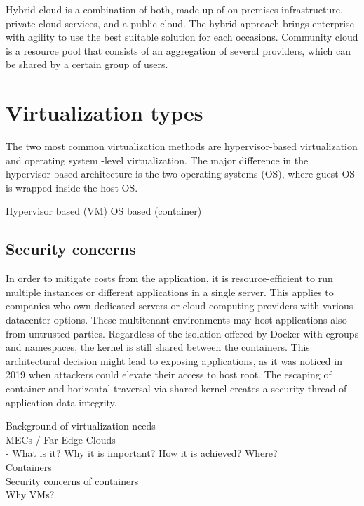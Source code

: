 Hybrid cloud is a combination of both, made up of on-premises infrastructure, private cloud services, and a public cloud. The hybrid approach brings enterprise with agility to use the best suitable solution for each occasions. \cite{NetApp} Community cloud is a resource pool that consists of an aggregation of several providers, which can be shared by a certain group of users. \cite{Taleb2017}


\section{Virtualization types}

The two most common virtualization methods are hypervisor-based virtualization and operating system -level virtualization. The major difference in the hypervisor-based architecture is the two operating systems (OS), where guest OS is wrapped inside the host OS. 


Hypervisor based (VM)
OS based (container)

\subsection{Security concerns}

In order to mitigate costs from the application, it is resource-efficient to run multiple instances or different applications in a single server. This applies to companies who own dedicated servers or cloud computing providers with various datacenter options. These multitenant environments may host applications also from untrusted parties. Regardless of the isolation offered by Docker with cgroups and namespaces, the kernel is still shared between the containers. This architectural decision might lead to exposing applications, as it was noticed in 2019 \cite{CVE-2019-5736} \cite{CVE-2020-14386} when attackers could elevate their access to host root. The escaping of container and horizontal traversal via shared kernel creates a security thread of application data integrity.



Background of virtualization needs \\
MECs / Far Edge Clouds \\
    - What is it? Why it is important? How it is achieved? Where? \\
Containers \\
Security concerns of containers \\
Why VMs? \\



